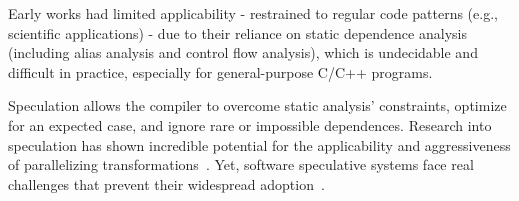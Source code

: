 %
%

Early works had limited applicability - restrained to regular code
patterns (e.g., scientific applications) - due to their reliance on
static dependence analysis (including alias analysis and control flow
analysis), which is undecidable and difficult in practice, especially
for general-purpose C/C++ programs.
%

%
%
%

%
%

Speculation allows the compiler to overcome static analysis' constraints,
optimize for an expected
case, and ignore rare or impossible dependences.
%
Research into speculation has
shown incredible potential for the applicability and aggressiveness of
parallelizing transformations~\cite{zhong:08:hpca, johnson:12:pldi}.
%
%
Yet, software speculative systems face real challenges that prevent their
widespread adoption~\cite{cascaval:08:stmtoy:short, .., ..}.

